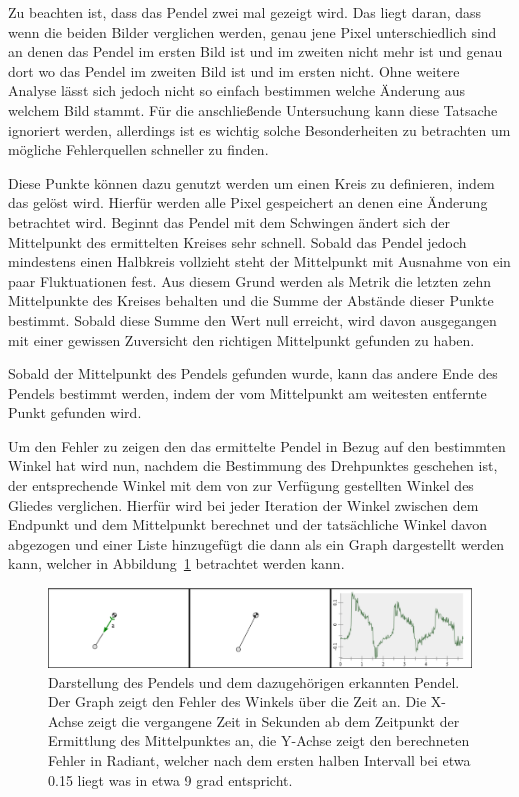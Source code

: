 Zu beachten ist, dass das Pendel zwei mal gezeigt wird.
Das liegt daran, dass wenn die beiden Bilder verglichen werden, genau jene Pixel unterschiedlich sind an denen das Pendel im ersten Bild ist und im zweiten nicht mehr ist und genau dort wo das Pendel im zweiten Bild ist und im ersten nicht.
Ohne weitere Analyse lässt sich jedoch nicht so einfach bestimmen welche Änderung aus welchem Bild stammt.
Für die anschließende Untersuchung kann diese Tatsache ignoriert werden, allerdings ist es wichtig solche Besonderheiten zu betrachten um mögliche Fehlerquellen schneller zu finden.

Diese Punkte können dazu genutzt werden um einen Kreis zu definieren, indem das  gelöst wird.
Hierfür werden alle Pixel gespeichert an denen eine Änderung betrachtet wird.
Beginnt das Pendel mit dem Schwingen ändert sich der Mittelpunkt des ermittelten Kreises sehr schnell.
Sobald das Pendel jedoch mindestens einen Halbkreis vollzieht steht der Mittelpunkt mit Ausnahme von ein paar Fluktuationen fest.
Aus diesem Grund werden als Metrik die letzten zehn Mittelpunkte des Kreises behalten und die Summe der Abstände dieser Punkte bestimmt.
Sobald diese Summe den Wert null erreicht, wird davon ausgegangen mit einer gewissen Zuversicht den richtigen Mittelpunkt gefunden zu haben.

Sobald der Mittelpunkt des Pendels gefunden wurde, kann das andere Ende des Pendels bestimmt werden, indem der vom Mittelpunkt am weitesten entfernte Punkt gefunden wird.

Um den Fehler zu zeigen den das ermittelte Pendel in Bezug auf den bestimmten Winkel hat wird nun, nachdem die Bestimmung des Drehpunktes geschehen ist, der entsprechende Winkel mit dem von  zur Verfügung gestellten Winkel des Gliedes verglichen.
Hierfür wird bei jeder Iteration der Winkel zwischen dem Endpunkt und dem Mittelpunkt berechnet und der tatsächliche Winkel davon abgezogen und einer Liste hinzugefügt die dann als ein Graph dargestellt werden kann, welcher in Abbildung~\ref{fig:pendel_prediction} betrachtet werden kann.

\begin{figure}[htb]
	\includegraphics[width=\textwidth]{gfx/compare_images_2.png}
	\caption{Darstellung des Pendels und dem dazugehörigen erkannten Pendel. Der Graph zeigt den Fehler des Winkels über die Zeit an. Die X-Achse zeigt die vergangene Zeit in Sekunden ab dem Zeitpunkt der Ermittlung des Mittelpunktes an, die Y-Achse zeigt den berechneten Fehler in Radiant, welcher nach dem ersten halben Intervall bei etwa 0.15 liegt was in etwa 9 grad entspricht.}
	\label{fig:pendel_prediction}
\end{figure}

